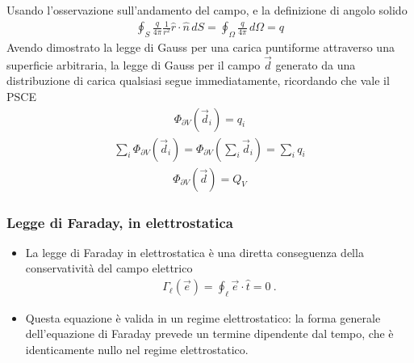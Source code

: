 \documentclass[letterpaper,10pt,italian]{jupyterBook}
\begin{document}
\sphinxAtStartPar
{}
Usando l’osservazione sull’andamento del campo, e la definizione di angolo solido
\begin{equation*}
\begin{split}\oint_S \frac{q}{4 \pi} \frac{1}{r^2} \hat{r} \cdot \hat{n} \, dS =
\oint_{\Omega} \frac{q}{4 \pi}  \, d \Omega = q \end{split}
\end{equation*}
\sphinxAtStartPar
{}
Avendo dimostrato la legge di Gauss per una carica puntiforme attraverso una superficie arbitraria, la legge di Gauss per il campo \(\vec{d}\) generato da una distribuzione di carica qualsiasi segue immediatamente, ricordando che vale il PSCE
\begin{equation*}
\begin{split}\Phi_{\partial V}(\vec{d}_i) = q_i\end{split}
\end{equation*}\begin{equation*}
\begin{split}\sum_i \Phi_{\partial V}(\vec{d}_i) = \Phi_{\partial V} \left(\sum_i \vec{d}_i \right) = \sum_i q_i\end{split}
\end{equation*}\begin{equation*}
\begin{split}\Phi_{\partial V}(\vec{d}) = Q_V\end{split}
\end{equation*}

\subsubsection{Legge di Faraday, in elettrostatica}
\label{\detokenize{ch/electromagnetism/electrostatics:legge-di-faraday-in-elettrostatica}}\begin{itemize}
\item {} 
\sphinxAtStartPar
La legge di Faraday in elettrostatica è una diretta conseguenza della conservatività del campo elettrico
\begin{equation*}
\begin{split}\Gamma_{\ell}(\vec{e}) = \oint_{\ell} \vec{e} \cdot \hat{t} = 0 \ .\end{split}
\end{equation*}
\item {} 
\sphinxAtStartPar
Questa equazione è valida  in un regime elettrostatico: la forma generale dell’equazione di Faraday prevede un termine dipendente dal tempo, che è identicamente nullo nel regime elettrostatico.

\end{itemize}
\end{document}
